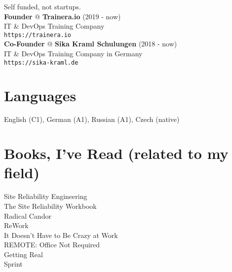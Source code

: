 \documentclass[12pt,a4paper]{article}
\begin{document}
Self funded, not startups.\\

{\bf Founder} @ {\bf Trainera.io} (2019 - now)\\
IT \& DevOps Training Company\\
\texttt{https://trainera.io}\\

{\bf Co-Founder} @ {\bf Sika Kraml Schulungen} (2018 - now)\\
IT \& DevOps Training Company in Germany\\
\texttt{https://sika-kraml.de}\\

\section*{Languages}
English (C1), German (A1), Russian (A1), Czech (native)\\

\section*{Books, I've Read (related to my field)}

Site Reliability Engineering\\
The Site Reliability Workbook\\
Radical Candor\\
ReWork\\
It Doesn't Have to Be Crazy at Work\\
REMOTE: Office Not Required\\
Getting Real\\
Sprint\\
\end{document}
